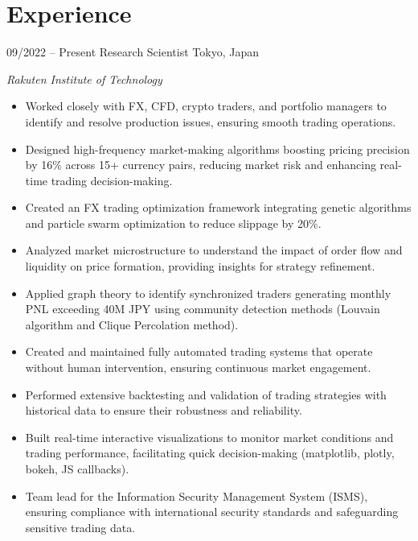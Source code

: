 

\section{Experience}
\begin{entrylist}
\entry
{09/2022 -- Present}
{Research Scientist}
{Tokyo, Japan}
{\emph{Rakuten Institute of Technology}
\begin{itemize}
    \item Worked closely with FX, CFD, crypto traders, and portfolio managers to identify and resolve production issues, ensuring smooth trading operations.
	\item Designed high-frequency market-making algorithms boosting pricing precision by 16\% across 15+ currency pairs, reducing market risk and enhancing real-time trading decision-making.
  	\item Created an FX trading optimization framework integrating genetic algorithms and particle swarm optimization to reduce slippage by 20\%.
	\item Analyzed market microstructure to understand the impact of order flow and liquidity on price formation, providing insights for strategy refinement.
    \item Applied graph theory to identify synchronized traders generating monthly PNL exceeding 40M JPY  using community detection methods (Louvain algorithm and Clique Percolation method).
    \item Created and maintained fully automated trading systems that operate without human intervention, ensuring continuous market engagement.
    \item Performed extensive backtesting and validation of trading strategies with historical data to ensure their robustness and reliability.
	\item Built real-time interactive visualizations to monitor market conditions and trading performance, facilitating quick decision-making (matplotlib, plotly, bokeh, JS callbacks).
 	\item Team lead for the Information Security Management System (ISMS), ensuring compliance with international security standards and safeguarding sensitive trading data.
\end{itemize}
}
\end{entrylist}

